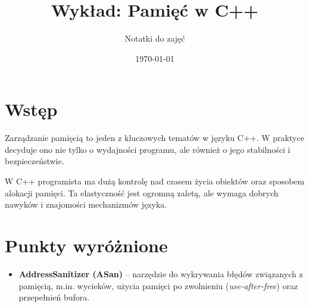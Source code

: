 \documentclass[a4paper,12pt]{article}
\title{Wykład: Pamięć w C++}
\author{Notatki do zajęć}
\date{\today}
\begin{document}
\maketitle

\section*{Wstęp}
Zarządzanie pamięcią to jeden z kluczowych tematów w języku C++.
W praktyce decyduje ono nie tylko o wydajności programu, ale również o jego
stabilności i bezpieczeństwie.

W C++ programista ma dużą kontrolę nad czasem życia obiektów oraz sposobem
alokacji pamięci. Ta elastyczność jest ogromną zaletą, ale wymaga dobrych
nawyków i znajomości mechanizmów języka.

\section*{Punkty wyróżnione}
\begin{itemize}[leftmargin=1.2cm]
    \item \textbf{AddressSanitizer (ASan)} -- narzędzie do wykrywania błędów
    związanych z pamięcią, m.in. wycieków, użycia pamięci po zwolnieniu
    (\textit{use-after-free}) oraz przepełnień bufora.
\end{itemize}
\end{document}
